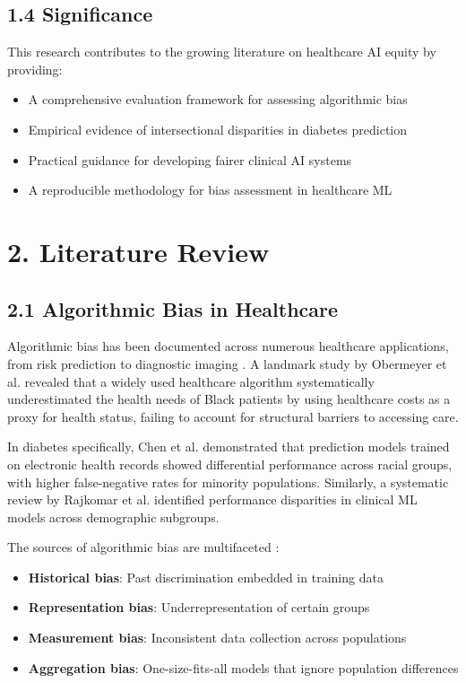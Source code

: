 \documentclass[12pt,a4paper]{article}
\begin{document}
\subsection{1.4 Significance}

This research contributes to the growing literature on healthcare AI equity 
by providing:

\begin{itemize}
    \item A comprehensive evaluation framework for assessing algorithmic bias
    \item Empirical evidence of intersectional disparities in diabetes prediction
    \item Practical guidance for developing fairer clinical AI systems
    \item A reproducible methodology for bias assessment in healthcare ML
\end{itemize}

\section{2. Literature Review}

\subsection{2.1 Algorithmic Bias in Healthcare}

Algorithmic bias has been documented across numerous healthcare applications, 
from risk prediction to diagnostic imaging \cite{rajkomar2018}. A landmark 
study by Obermeyer et al. \cite{obermeyer2019} revealed that a widely used 
healthcare algorithm systematically underestimated the health needs of Black 
patients by using healthcare costs as a proxy for health status, failing to 
account for structural barriers to accessing care.

In diabetes specifically, Chen et al. \cite{chen2019} demonstrated that 
prediction models trained on electronic health records showed differential 
performance across racial groups, with higher false-negative rates for 
minority populations. Similarly, a systematic review by Rajkomar et al. 
\cite{rajkomar2018} identified performance disparities in clinical ML 
models across demographic subgroups.

The sources of algorithmic bias are multifaceted \cite{mehrabi2021}:
\begin{itemize}
    \item \textbf{Historical bias}: Past discrimination embedded in training data
    \item \textbf{Representation bias}: Underrepresentation of certain groups
    \item \textbf{Measurement bias}: Inconsistent data collection across populations
    \item \textbf{Aggregation bias}: One-size-fits-all models that ignore population differences
\end{itemize}
\end{document}

